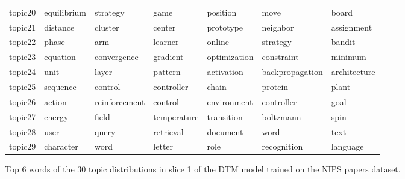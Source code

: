 \documentclass[letterpaper]{article}
\begin{document}
\begin{figure}[ht]
\begin{tabular}{l | l l l l l l}
    topic20 & 	equilibrium & 	strategy & 	game & 	position & 	move & 	board \\
    topic21 & 	distance & 	cluster & 	center & 	prototype & 	neighbor & 	assignment \\
    topic22 & 	phase & 	arm & 	learner & 	online & 	strategy & 	bandit \\
    topic23 & 	equation & 	convergence & 	gradient & 	optimization & 	constraint & 	minimum \\
    topic24 & 	unit & 	layer & 	pattern & 	activation & 	backpropagation & 	architecture \\
    topic25 & 	sequence & 	control & 	controller & 	chain & 	protein & 	plant \\
    topic26 & 	action & 	reinforcement & 	control & 	environment & 	controller & 	goal \\
    topic27 & 	energy & 	field & 	temperature & 	transition & 	boltzmann & 	spin \\
    topic28 & 	user & 	query & 	retrieval & 	document & 	word & 	text \\
    topic29 & 	character & 	word & 	letter & 	role & 	recognition & 	language \\
  \end{tabular}
  \caption{\label{fig:dtm_slice1} Top 6 words of the 30 topic distributions in slice 1 of the DTM model trained on the NIPS papers dataset.}
\end{figure}
\end{document}
